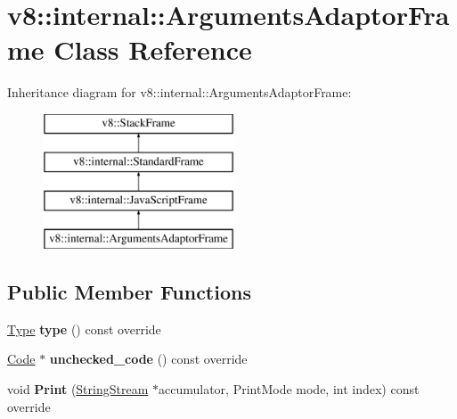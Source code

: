 \hypertarget{classv8_1_1internal_1_1_arguments_adaptor_frame}{}\section{v8\+:\+:internal\+:\+:Arguments\+Adaptor\+Frame Class Reference}
\label{classv8_1_1internal_1_1_arguments_adaptor_frame}
Inheritance diagram for v8\+:\+:internal\+:\+:Arguments\+Adaptor\+Frame\+:\begin{figure}[H]
\begin{center}
\leavevmode
\includegraphics[height=4.000000cm]{classv8_1_1internal_1_1_arguments_adaptor_frame}
\end{center}
\end{figure}
\subsection*{Public Member Functions}
\begin{DoxyCompactItemize}
\item 
\hyperlink{classv8_1_1internal_1_1_type}{Type} {\bfseries type} () const  override\hypertarget{classv8_1_1internal_1_1_arguments_adaptor_frame_a41a2a6927fd531a5915e7a814ed3a4cf}{}\label{classv8_1_1internal_1_1_arguments_adaptor_frame_a41a2a6927fd531a5915e7a814ed3a4cf}

\item 
\hyperlink{classv8_1_1internal_1_1_code}{Code} $\ast$ {\bfseries unchecked\+\_\+code} () const  override\hypertarget{classv8_1_1internal_1_1_arguments_adaptor_frame_a3c5828b4f0cec0495414552a5c1179c5}{}\label{classv8_1_1internal_1_1_arguments_adaptor_frame_a3c5828b4f0cec0495414552a5c1179c5}

\item 
void {\bfseries Print} (\hyperlink{classv8_1_1internal_1_1_string_stream}{String\+Stream} $\ast$accumulator, Print\+Mode mode, int index) const  override\hypertarget{classv8_1_1internal_1_1_arguments_adaptor_frame_a732c0ccd5b48d54e020f5cc24b86c8b1}{}\label{classv8_1_1internal_1_1_arguments_adaptor_frame_a732c0ccd5b48d54e020f5cc24b86c8b1}

\end{DoxyCompactItemize}
